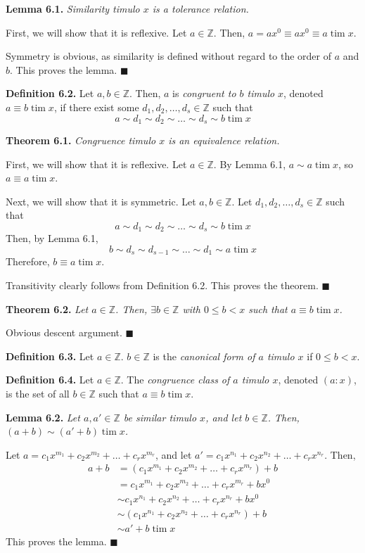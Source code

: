 \documentclass{article}
\newcommand{\tim}{\;\text{tim}\;}
\newcommand{\zee}{\mathbb{Z}}
\begin{document}
\textbf{Lemma 6.1.} \textit{Similarity timulo $x$ is a
tolerance relation.}

First, we will show that it is reflexive. Let $a \in \zee$.
Then, $a = ax^0 \equiv ax^0 \equiv a \tim x$.

Symmetry is obvious, as similarity is defined without
regard to the order of $a$ and $b$. This proves the lemma.
$\blacksquare$


\textbf{Definition 6.2.} Let $a, b \in \zee$.
Then, $a$ is \textit{congruent to $b$ timulo} $x$, denoted
$a \equiv b \tim x$, if there exist some $d_1, d_2, \ldots, d_s \in \zee$
such that
\[a \sim d_1 \sim d_2 \sim \ldots \sim d_s \sim b \tim x\]

\textbf{Theorem 6.1.} \textit{Congruence timulo $x$ is an
equivalence relation.}

First, we will show that it is reflexive. Let $a \in \zee$.
By Lemma 6.1, $a \sim a \tim x$, so $a \equiv a \tim x$.

Next, we will show that it is symmetric. Let $a, b \in \zee$.
Let $d_1, d_2, \ldots, d_s \in \zee$ such that
\[a \sim d_1 \sim d_2 \sim \ldots \sim d_s \sim b \tim x\]
Then, by Lemma 6.1,
\[b \sim d_s \sim d_{s-1} \sim \ldots \sim d_1 \sim a \tim x\]
Therefore, $b \equiv a \tim x$.

Transitivity clearly follows from Definition 6.2. This proves the
theorem. $\blacksquare$

\textbf{Theorem 6.2.} \textit{Let $a \in \zee$.
Then, $\exists b \in \zee$ with $0 \leq b < x$
such that $a \equiv b \tim x$.}

Obvious descent argument. $\blacksquare$

\textbf{Definition 6.3.} Let $a \in \zee$.
$b \in \zee$ is the \textit{canonical form of $a$ timulo $x$}
if $0 \leq b < x$.

\textbf{Definition 6.4.} Let $a \in \zee$. The
\textit{congruence class of $a$ timulo $x$},
denoted $(a:x)$, is the set of all $b \in \zee$
such that $a \equiv b \tim x$.

\textbf{Lemma 6.2.} \textit{Let $a, a' \in \zee$ be
similar timulo $x$, and let $b \in \zee$. Then,
$(a + b) \sim (a' + b) \tim x$.}

Let $a = c_1x^{m_1} + c_2x^{m_2} + \ldots + c_rx^{m_r}$,
and let
$a' = c_1x^{n_1} + c_2x^{n_2} + \ldots + c_rx^{n_r}$.
Then,
\[\begin{split}
    a + b &= (c_1x^{m_1} + c_2x^{m_2} + \ldots + c_rx^{m_r}) + b \\
    &= c_1x^{m_1} + c_2x^{m_2} + \ldots + c_rx^{m_r} + bx^0 \\
    &\sim c_1x^{n_1} + c_2x^{n_2} + \ldots + c_rx^{n_r} + bx^0 \\
    &\sim (c_1x^{n_1} + c_2x^{n_2} + \ldots + c_rx^{n_r}) + b \\
    &\sim a' + b \tim x
\end{split}\]
This proves the lemma. $\blacksquare$
\end{document}
